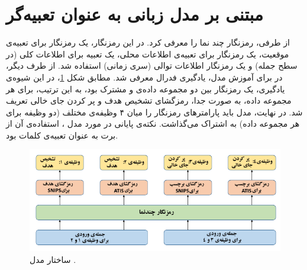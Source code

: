 \section{مبتنی بر مدل زبانی به عنوان تعبیه‌گر}
از طرفی،  \cite{huang:2020} رمزنگار چند نما را معرفی کرد. در این رمزنگار، یک رمزنگار برای تعبیه‌ی موقعیت، یک رمزنگار برای تعبیه‌ی اطلاعات محلی، یک تعبیه برای اطلاعات کلی (در سطح جمله) و یک رمزنگار اطلاعات توالی (سری زمانی) استفاده شد. از طرف دیگر، در برای آموزش مدل، یادگیری فدرال معرفی شد. مطابق شکل \ref{Fig:federated}، در این شیوه‌ی یادگیری، یک رمزنگار بین دو مجموعه داده‌ی  و  مشترک بود، به این ترتیب، برای هر مجموعه داده، به صورت جدا، رمزگشای تشخیص هدف و پر کردن جای خالی تعریف شد. در نهایت، مدل باید پارامترهای رمزنگار را میان ۴ وظیفه‌ی مختلف (دو وظیفه برای هر مجموعه داده) به اشتراک می‌گذاشت. نکته‌ی پایانی در مورد مدل  ، استفاده‌ی آن از برت به عنوان تعبیه‌ی کلمات بود.
\begin{figure}[!htb]
	\centering
	\includegraphics[scale=1.4]{Figures/federated.pdf}
	\caption[ساختار مدل ]{ساختار مدل  \cite{huang:2020}.}
	\label{Fig:federated}
\end{figure}


